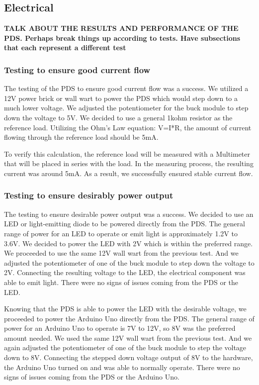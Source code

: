 \documentclass[conference]{IEEEtran}
\begin{document}
	\subsection{Electrical}
	\textbf{TALK ABOUT THE RESULTS AND PERFORMANCE OF THE PDS. Perhaps break things up according to tests. Have subsections that each represent a different test}
		\subsubsection{Testing to ensure good current flow}
		
		The testing of the PDS to ensure good current flow was a success. We utilized a 12V power brick or wall wart to power the PDS which would step down to a much lower voltage. We adjusted the potentiometer for the buck module to step down the voltage to 5V. We decided to use a general 1kohm resistor as the reference load. Utilizing the Ohm's Law equation: V=I*R, the amount of current flowing through the reference load should be 5mA.
		
		\indent To verify this calculation, the reference load will be measured with a Multimeter that will be placed in series with the load. In the measuring process, the resulting current was around 5mA. As a result, we successfully ensured stable current flow.
		
		\subsubsection{Testing to ensure desirably power output}
		The testing to ensure desirable power output was a success. We decided to use an LED or light-emitting diode to be powered directly from the PDS. The general range of power for an LED to operate or emit light is approximately 1.2V to 3.6V. We decided to power the LED with 2V which is within the preferred range. We proceeded to use the same 12V wall wart from the previous test. And we adjusted the potentiometer of one of the buck module to step down the voltage to 2V. Connecting the resulting voltage to the LED, the electrical component was able to emit light. There were no signs of issues coming from the PDS or the LED.
		
		\indent Knowing that the PDS is able to power the LED with the desirable voltage, we proceeded to power the Arduino Uno directly from the PDS. The general range of power for an Arduino Uno to operate is 7V to 12V, so 8V was the preferred amount needed. We used the same 12V wall wart from the previous test. And we again adjusted the potentiometer of one of the buck module to step the voltage down to 8V. Connecting the stepped down voltage output of 8V to the hardware, the Arduino Uno turned on and was able to normally operate. There were no signs of issues coming from the PDS or the Arduino Uno.   
		
\end{document}
